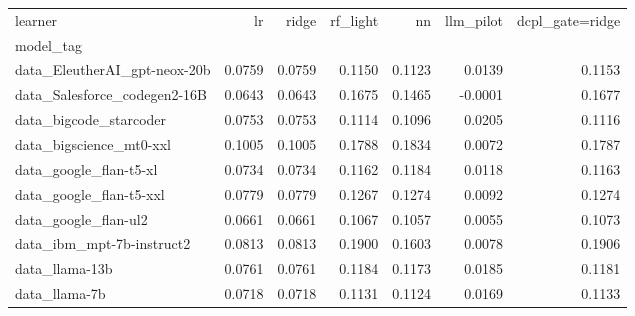\begin{tabular}{lrrrrrr}
\toprule
learner & lr & ridge & rf\_light & nn & llm\_pilot & dcpl\_gate=ridge \\
model_tag &  &  &  &  &  &  \\
\midrule
data\_EleutherAI\_gpt-neox-20b & 0.0759 & 0.0759 & 0.1150 & 0.1123 & 0.0139 & 0.1153 \\
data\_Salesforce\_codegen2-16B & 0.0643 & 0.0643 & 0.1675 & 0.1465 & -0.0001 & 0.1677 \\
data\_bigcode\_starcoder & 0.0753 & 0.0753 & 0.1114 & 0.1096 & 0.0205 & 0.1116 \\
data\_bigscience\_mt0-xxl & 0.1005 & 0.1005 & 0.1788 & 0.1834 & 0.0072 & 0.1787 \\
data\_google\_flan-t5-xl & 0.0734 & 0.0734 & 0.1162 & 0.1184 & 0.0118 & 0.1163 \\
data\_google\_flan-t5-xxl & 0.0779 & 0.0779 & 0.1267 & 0.1274 & 0.0092 & 0.1274 \\
data\_google\_flan-ul2 & 0.0661 & 0.0661 & 0.1067 & 0.1057 & 0.0055 & 0.1073 \\
data\_ibm\_mpt-7b-instruct2 & 0.0813 & 0.0813 & 0.1900 & 0.1603 & 0.0078 & 0.1906 \\
data\_llama-13b & 0.0761 & 0.0761 & 0.1184 & 0.1173 & 0.0185 & 0.1181 \\
data\_llama-7b & 0.0718 & 0.0718 & 0.1131 & 0.1124 & 0.0169 & 0.1133 \\
\bottomrule
\end{tabular}
